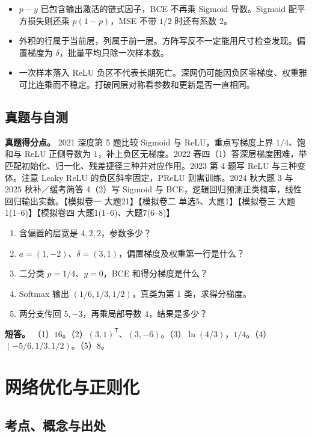 \documentclass[UTF8,a4paper,zihao=-4,fontset=fandol]{ctexart}
\begin{document}
\begin{itemize}
\item $p-y$ 已包含输出激活的链式因子，BCE 不再乘 Sigmoid 导数。Sigmoid 配平方损失则还乘 $p(1-p)$，MSE 不带 $1/2$ 时还有系数 $2$。
\item 外积的行属于当前层，列属于前一层。方阵写反不一定能用尺寸检查发现。偏置梯度为 $\delta$，批量平均只除一次样本数。
\item 一次样本落入 ReLU 负区不代表长期死亡。深网仍可能因负区零梯度、权重雅可比连乘而不稳定。打破同层对称看参数和更新是否一直相同。
\end{itemize}

\subsection{真题与自测}

\textbf{真题得分点。} 2021 深度第 5 题比较 Sigmoid 与 ReLU，重点写梯度上界 $1/4$、饱和与 ReLU 正侧导数为 $1$，补上负区无梯度。2022 春四（1）答深层梯度困难，举匹配初始化、归一化、残差捷径三种并对应作用。2023 第 4 题写 ReLU 与三种变体。注意 Leaky ReLU 的负区斜率固定，PReLU 则需训练。2024 秋大题 3 与 2025 秋补／缓考简答 4（2）写 Sigmoid 与 BCE，逻辑回归预测正类概率，线性回归输出实数。【模拟卷一 大题21】【模拟卷二 单选5、大题1】【模拟卷三 大题1(1--6)】【模拟卷四 大题1(1--6)、大题7(6--8)】

\begin{enumerate}
\item 含偏置的层宽是 $4,2,2$，参数多少？
\item $a=(1,-2)$、$\delta=(3,1)$，偏置梯度及权重第一行是什么？
\item 二分类 $p=1/4$、$y=0$，BCE 和得分梯度是什么？
\item Softmax 输出 $(1/6,1/3,1/2)$，真类为第 1 类，求得分梯度。
\item 两分支传回 $5,-3$，再乘局部导数 $4$，结果是多少？
\end{enumerate}
\textbf{短答。} （1）$16$。（2）$(3,1)^{\mathsf T}$、$(3,-6)$。（3）$\ln(4/3)$，$1/4$。（4）$(-5/6,1/3,1/2)$。（5）$8$。

\section{网络优化与正则化}
\subsection{考点、概念与出处}
\end{document}
